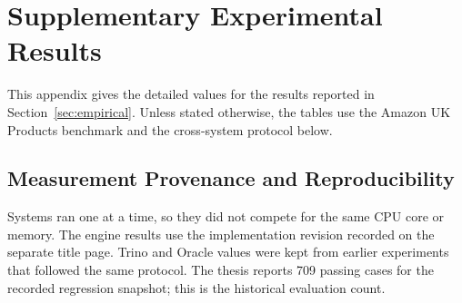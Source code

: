\documentclass[preprint,12pt,times,a4paper]{elsarticle}
\begin{document}
\appendix
\setcounter{table}{0}
\setcounter{figure}{0}
\renewcommand{\thetable}{\Alph{section}.\arabic{table}}
\renewcommand{\theHtable}{\Alph{section}.\arabic{table}}
\renewcommand{\thefigure}{\Alph{section}.\arabic{figure}}
\renewcommand{\theHfigure}{\Alph{section}.\arabic{figure}}
\renewcommand{\thesubsection}{\Alph{section}.\arabic{subsection}}
\section{Supplementary Experimental Results}

This appendix gives the detailed values for the results reported in
Section~\ref{sec:empirical}. Unless stated otherwise, the tables use the
Amazon UK Products benchmark and the cross-system protocol below.

\subsection{Measurement Provenance and Reproducibility}
\label{app:provenance}

Systems ran one at a time, so they did not compete for the same CPU core
or memory. The engine results use the implementation revision recorded on
the separate title page.
Trino and Oracle values were kept from earlier experiments that followed the
same protocol. The thesis reports 709 passing cases for the recorded
regression snapshot; this is the historical evaluation count.
\end{document}
